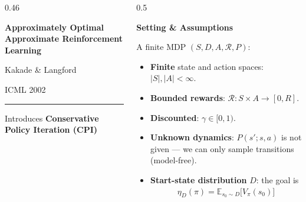 \documentclass[aspectratio=169]{beamer}
\newcommand{\E}{\mathbb{E}}
\begin{document}
\begin{frame}
  \begin{columns}[c]
    \begin{column}{0.46\textwidth}
      \begin{tcolorbox}[colback=AtlasCool, colframe=AtlasCool, arc=3pt, boxrule=0pt,
                        height=0.8\textheight, valign=center, left=12pt, right=12pt]
        \color{white}\raggedright
        {\Large\bfseries Approximately Optimal Approximate Reinforcement Learning\par}
        \vspace{12pt}
        {\large Kakade \& Langford\par}
        {\small ICML 2002\par}
        \vspace{16pt}
        {\color{white!80!AtlasCool}\rule{0.4\linewidth}{0.6pt}\par}
        \vspace{6pt}
        {\small Introduces \textbf{Conservative Policy Iteration (CPI)}\par}
      \end{tcolorbox}
    \end{column}
    \begin{column}{0.5\textwidth}
      {\large\bfseries\color{AtlasAccent}Setting \& Assumptions\par}
      \vspace{6pt}
      \small
      A finite MDP $(S, D, A, \mathcal{R}, P)$:
      \begin{itemize}
        \item \textbf{Finite} state and action spaces: $|S|, |A| < \infty$.
        \item \textbf{Bounded rewards}: $\mathcal{R}: S \times A \to [0, R]$.
        \item \textbf{Discounted}: $\gamma \in [0,1)$.
        \item \textbf{Unknown dynamics}: $P(s' ; s, a)$ is not given ---
          we can only sample transitions (model-free).
        \item \textbf{Start-state distribution} $D$: the goal is
          \begin{gather*}
            \eta_D(\pi) = \E_{s_0 \sim D}\big[V_\pi(s_0)\big]
          \end{gather*}
      \end{itemize}
    \end{column}
  \end{columns}
\end{frame}
\end{document}
